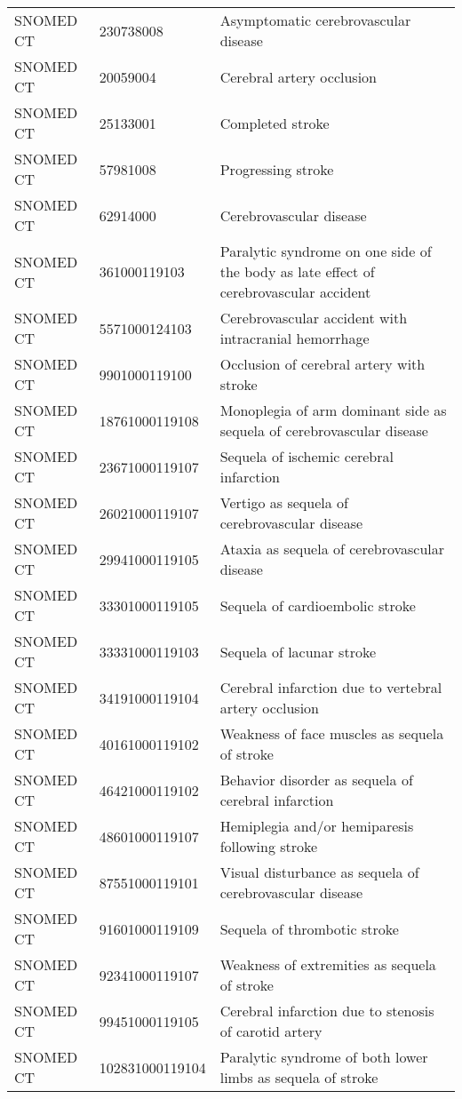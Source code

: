 \begin{longtable}{p{}p{}p{}}
  SNOMED CT & 230738008 & Asymptomatic cerebrovascular disease \\ 
  SNOMED CT & 20059004 & Cerebral artery occlusion \\ 
  SNOMED CT & 25133001 & Completed stroke \\ 
  SNOMED CT & 57981008 & Progressing stroke \\ 
  SNOMED CT & 62914000 & Cerebrovascular disease \\ 
  SNOMED CT & 361000119103 & Paralytic syndrome on one side of the body as late effect of cerebrovascular accident \\ 
  SNOMED CT & 5571000124103 & Cerebrovascular accident with intracranial hemorrhage \\ 
  SNOMED CT & 9901000119100 & Occlusion of cerebral artery with stroke \\ 
  SNOMED CT & 18761000119108 & Monoplegia of arm dominant side as sequela of cerebrovascular disease \\ 
  SNOMED CT & 23671000119107 & Sequela of ischemic cerebral infarction \\ 
  SNOMED CT & 26021000119107 & Vertigo as sequela of cerebrovascular disease \\ 
  SNOMED CT & 29941000119105 & Ataxia as sequela of cerebrovascular disease \\ 
  SNOMED CT & 33301000119105 & Sequela of cardioembolic stroke \\ 
  SNOMED CT & 33331000119103 & Sequela of lacunar stroke \\ 
  SNOMED CT & 34191000119104 & Cerebral infarction due to vertebral artery occlusion \\ 
  SNOMED CT & 40161000119102 & Weakness of face muscles as sequela of stroke \\ 
  SNOMED CT & 46421000119102 & Behavior disorder as sequela of cerebral infarction \\ 
  SNOMED CT & 48601000119107 & Hemiplegia and/or hemiparesis following stroke \\ 
  SNOMED CT & 87551000119101 & Visual disturbance as sequela of cerebrovascular disease \\ 
  SNOMED CT & 91601000119109 & Sequela of thrombotic stroke \\ 
  SNOMED CT & 92341000119107 & Weakness of extremities as sequela of stroke \\ 
  SNOMED CT & 99451000119105 & Cerebral infarction due to stenosis of carotid artery \\ 
  SNOMED CT & 102831000119104 & Paralytic syndrome of both lower limbs as sequela of stroke \\ 

\end{longtable}
